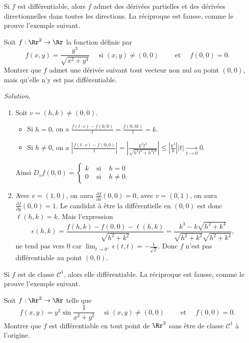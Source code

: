 \documentclass[12pt, class=report,crop=false]{standalone}
\begin{document}
{\bigskip



Si $f$ est différentiable, alors $f$ admet des dérivées partielles et des dérivées directionnelles dans toutes les directions. La réciproque est fausse, comme le prouve l'exemple suivant.

\begin{exemple}
Soit $f:\Rr^2\to \Rr$ la fonction définie par
$$f(x,y)=\frac{y^3}{\sqrt{x^2+y^4}}\quad \text{ si }(x,y)\neq (0,0)\qquad \text{ et }\quad f(0,0)=0.$$
Montrer que $f$ admet une dérivée suivant tout vecteur non nul au point $(0,0)$, mais qu'elle n'y est pas différentiable.


\bigskip
\emph{Solution.}

\begin{enumerate}
\item Soit $v=(h,k)\neq (0,0)$.
\begin{itemize}
  \item Si $h=0$, on a $\displaystyle \frac{f(t \cdot v)-f(0,0)}{t}=\frac{f(0,tk)}{t}=k$.
  \item Si $h\neq 0$, on a $\displaystyle \left\vert \frac{f(t\cdot v)-f(0,0)}{t}\right\vert= \left\vert \frac{k^3t^2}{\sqrt{h^2t^2+h^4t^4}}\right\vert \le \left\vert \frac{k^3}{h}\right\vert |t|\underset{t\to 0}{\longrightarrow} 0$.
\end{itemize}
Ainsi $\displaystyle D_{v}f(0,0)=
\left\{
\begin{array}{ccc}
k&\text{ si }& h =0 \\ 
0&\text{ si }& h\neq 0. 
\end{array}\right.$


\item Avec $v=(1,0)$, on aura $\frac{\partial f}{\partial x}(0,0)=0$, avec $v=(0,1)$, on aura $\frac{\partial f}{\partial y}(0,0)=1$. 
Le candidat à être la différentielle en $(0,0)$ est donc $\ell(h,k)  = k$.
Mais l'expression
$$\epsilon (h,k)=\frac{f(h,k)-f(0,0)-\ell(h,k)}{\sqrt{h^2+k^2}}=\frac{k^3-k\sqrt{h^2+k^4}}{\sqrt{h^2+k^2}\sqrt{h^2+k^4}},$$
ne tend pas vers $0$ car $\lim _{t\to 0^+}\epsilon (t,t)=-\frac{1}{\sqrt{2}}$. Donc $f$ n'est pas différentiable au point $(0,0)$.
\end{enumerate}
\end{exemple}

\bigskip

Si $f$ est de classe $\mathcal{C}^1$, alors elle différentiable. La réciproque est fausse, comme le prouve l'exemple suivant.

\begin{exemple}
Soit $f:\Rr^2\to \Rr$ telle que
$$f(x,y)=y^2\sin \frac{1}{x^2+y^2}\quad \text{ si }(x,y)\neq (0,0)\qquad \text{ et }\quad f(0,0)=0.$$
Montrer que $f$ est différentiable en tout point de $\Rr^2$ sans être de classe $\mathscr{C}^1$ à l'origine.


\end{exemple}}
\end{document}
